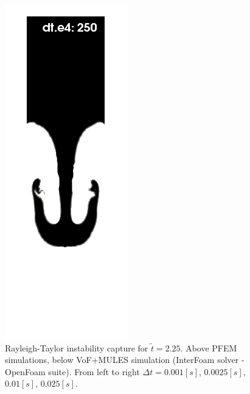 \begin{figure}[htbp]
\begin{center}
      \includegraphics[width=.24\columnwidth]{images/rayleigh_pfem_dts_D.jpg}
      
  \end{center}
  \caption{\label{fg:rayleigh-comparison-dts} Rayleigh-Taylor instability capture for $\widetilde{t}=2.25$. Above PFEM simulations, below VoF+MULES simulation (InterFoam solver - OpenFoam suite). From left to right $\Delta t =0.001[s]$, $0.0025[s]$, $0.01[s]$, $0.025[s]$.}
\end{figure}
\afterpage{\clearpage}

